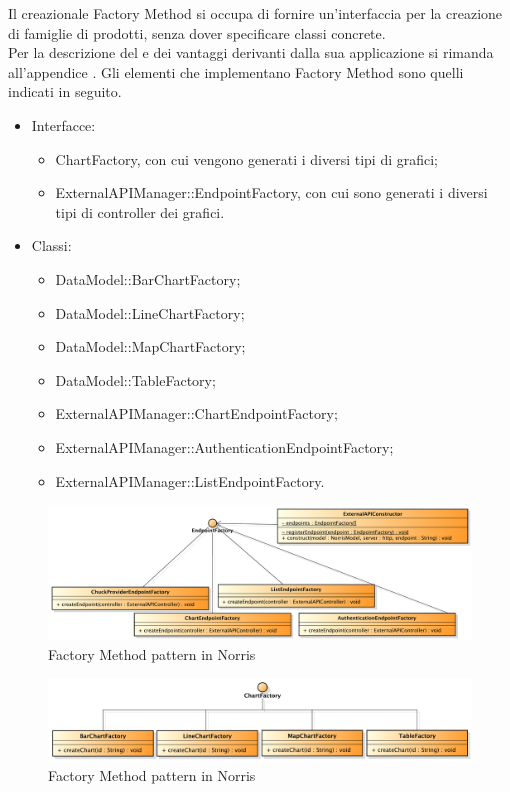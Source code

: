 				Il  creazionale Factory Method si occupa di fornire un'interfaccia per la creazione di famiglie di prodotti, senza dover specificare classi concrete.\\
		Per la descrizione del  e dei vantaggi derivanti dalla sua applicazione si rimanda all'appendice .
					Gli elementi che implementano Factory Method sono quelli indicati in seguito.
					\begin{itemize}
						\item Interfacce:
						\begin{itemize}
							\item ChartFactory, con cui vengono generati i diversi tipi di grafici;
							\item ExternalAPIManager::EndpointFactory, con cui sono generati i diversi tipi di controller dei grafici.
						\end{itemize}
						\item Classi:
						\begin{itemize}
							\item DataModel::BarChartFactory;
							\item DataModel::LineChartFactory;
							\item DataModel::MapChartFactory;
							\item DataModel::TableFactory;
							\item ExternalAPIManager::ChartEndpointFactory;
							\item ExternalAPIManager::AuthenticationEndpointFactory;
							\item ExternalAPIManager::ListEndpointFactory.
						\end{itemize}
					\end{itemize}
					\begin{figure}[H]\centering
	        		\includegraphics[width=\textwidth]{SpecificaTecnica/Pics/DesignPatternNorris/Factory1}
	        		\caption{Factory Method pattern in Norris}
	    			\end{figure}
	    			\begin{figure}[H]\centering
	        			\includegraphics[width=\textwidth]{SpecificaTecnica/Pics/DesignPatternNorris/Factory2}
	        			\caption{Factory Method pattern in Norris}
	    			\end{figure}
			
